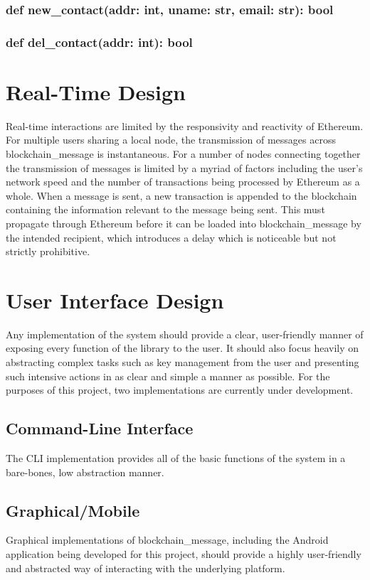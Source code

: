\documentclass[titlepage]{report}
\begin{document}
\subsubsection{def new\_contact(addr: int, uname: str, email: str): bool}
\subsubsection{def del\_contact(addr: int): bool}

\section{Real-Time Design}
Real-time interactions are limited by the responsivity and reactivity of Ethereum. For multiple users sharing a local node, the transmission of messages across blockchain\_message is instantaneous. For a number of nodes connecting together the transmission of messages is limited by a myriad of factors including the user's network speed and the number of transactions being processed by Ethereum as a whole. When a message is sent, a new transaction is appended to the blockchain containing the information relevant to the message being sent. This must propagate through Ethereum before it can be loaded into blockchain\_message by the intended recipient, which introduces a delay which is noticeable but not strictly prohibitive.

\section{User Interface Design}
Any implementation of the system should provide a clear, user-friendly manner of exposing every function of the library to the user. It should also focus heavily on abstracting complex tasks such as key management from the user and presenting such intensive actions in as clear and simple a manner as possible. For the purposes of this project, two implementations are currently under development.

\subsection{Command-Line Interface}
The CLI implementation provides all of the basic functions of the system in a bare-bones, low abstraction manner.

\subsection{Graphical/Mobile}
Graphical implementations of blockchain\_message, including the Android application being developed for this project, should provide a highly user-friendly and abstracted way of interacting with the underlying platform.
\end{document}
